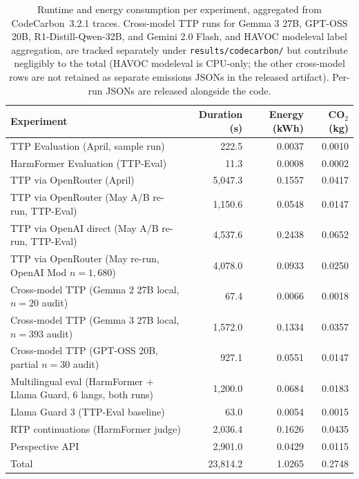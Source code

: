 \documentclass[10pt]{article} %
\begin{document}
\begin{table}[H]
\centering
\small
\setlength{\tabcolsep}{4pt}
\begin{tabular}{lrrr}
\hline
Experiment & Duration (s) & Energy (kWh) & CO$_2$ (kg) \\
\hline
TTP Evaluation (April, sample run)               & 222.5    & 0.0037 & 0.0010 \\
HarmFormer Evaluation (TTP-Eval)                 & 11.3     & 0.0008 & 0.0002 \\
TTP via OpenRouter (April)                       & 5,047.3  & 0.1557 & 0.0417 \\
TTP via OpenRouter (May A/B re-run, TTP-Eval)    & 1,150.6  & 0.0548 & 0.0147 \\
TTP via OpenAI direct (May A/B re-run, TTP-Eval) & 4,537.6  & 0.2438 & 0.0652 \\
TTP via OpenRouter (May re-run, OpenAI Mod $n{=}1{,}680$) & 4,078.0 & 0.0933 & 0.0250 \\
Cross-model TTP (Gemma 2 27B local, $n{=}20$ audit) & 67.4  & 0.0066 & 0.0018 \\
Cross-model TTP (Gemma 3 27B local, $n{=}393$ audit) & 1{,}572.0 & 0.1334 & 0.0357 \\
Cross-model TTP (GPT-OSS 20B, partial $n{=}30$ audit) & 927.1 & 0.0551 & 0.0147 \\
Multilingual eval (HarmFormer + Llama Guard, 6 langs, both runs) & 1{,}200.0 & 0.0684 & 0.0183 \\
Llama Guard 3 (TTP-Eval baseline)                & 63.0     & 0.0054 & 0.0015 \\
RTP continuations (HarmFormer judge)             & 2,036.4  & 0.1626 & 0.0435 \\
Perspective API                                  & 2,901.0  & 0.0429 & 0.0115 \\
\hline
Total                                            & 23{,}814.2 & 1.0265 & 0.2748 \\
\hline
\end{tabular}
\caption{Runtime and energy consumption per experiment, aggregated from CodeCarbon~3.2.1 traces. Cross-model TTP runs for Gemma 3 27B, GPT-OSS 20B, R1-Distill-Qwen-32B, and Gemini 2.0 Flash, and HAVOC modeleval label aggregation, are tracked separately under \texttt{results/codecarbon/} but contribute negligibly to the total (HAVOC modeleval is CPU-only; the other cross-model rows are not retained as separate emissions JSONs in the released artifact). Per-run JSONs are released alongside the code.}
\label{tab:compute}
\end{table}
\newpage
\end{document}
